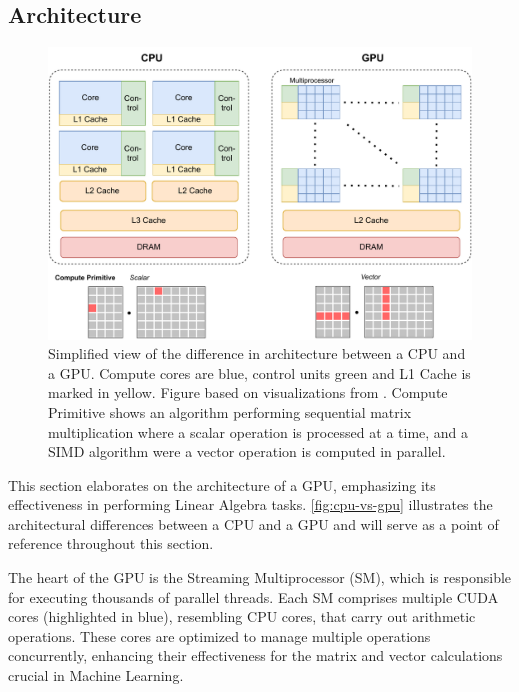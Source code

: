 \subsection{Architecture}
\label{subsec:gpu-architecture}

\begin{figure}[ht]
  \includegraphics[width=.95\linewidth]{chapters/02_preliminaries/figures/CPU-vs-GPU.pdf}
  \caption[Simplified view of the difference in architecture between a CPU and a GPU.]{ Simplified view of the difference in architecture between a CPU and a GPU. Compute cores are blue, control units green and L1 Cache is marked in yellow. Figure based on visualizations from \cite{gpu-in-ml-survey, cuda-programming-guide, tvm}. Compute Primitive shows an algorithm performing sequential matrix multiplication where a scalar operation is processed at a time, and a SIMD algorithm were a vector operation is computed in parallel.}
  \label{fig:cpu-vs-gpu}
\end{figure}
This section elaborates on the architecture of a GPU, emphasizing its effectiveness in performing Linear Algebra tasks. \autoref{fig:cpu-vs-gpu} illustrates the architectural differences between a CPU and a GPU and will serve as a point of reference throughout this section.

The heart of the GPU is the Streaming Multiprocessor (SM), which is responsible for executing thousands of parallel threads. Each SM comprises multiple CUDA cores (highlighted in blue), resembling CPU cores, that carry out arithmetic operations. These cores are optimized to manage multiple operations concurrently, enhancing their effectiveness for the matrix and vector calculations crucial in Machine Learning.

